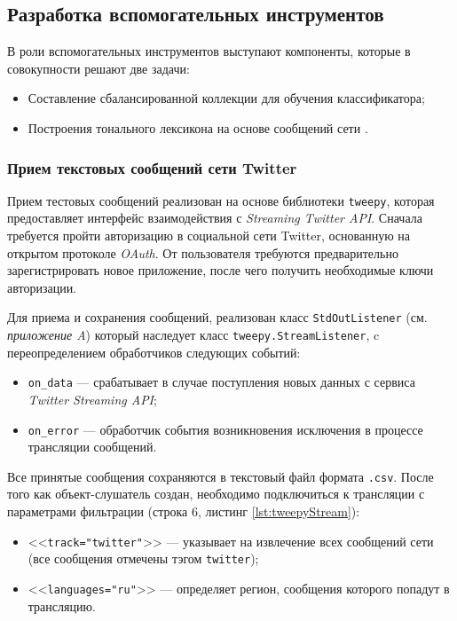 \subsection{Разработка вспомогательных инструментов}
В роли вспомогательных инструментов выступают компоненты, которые в совокупности
решают две задачи:
\begin{itemize}
    \item Составление сбалансированной коллекции для обучения классификатора;
    \item Построения тонального лексикона на основе сообщений сети \twitter.
\end{itemize}


    \subsubsection{Прием текстовых сообщений сети Twitter}
    Прием тестовых сообщений реализован на основе библиотеки {\tt tweepy}, которая
    предоставляет интерфейс взаимодействия с {\it Streaming Twitter API}.
    Сначала требуется пройти авторизацию в социальной сети Twitter, основанную
    на открытом протоколе {\it OAuth}.
    От пользователя требуются предварительно зарегистрировать новое приложение,
    после чего получить необходимые ключи авторизации.

    Для приема и сохранения сообщений, реализован класс {\tt StdOutListener}
    (см. {\it приложение A}) который  наследует класс {\tt tweepy.StreamListener},
    c переопределением обработчиков следующих событий:
    \begin{itemize}
        \item {\tt on\_data} --- срабатывает в случае поступления новых данных
        с сервиса {\it Twitter Streaming API};
        \item {\tt on\_error} --- обработчик события возникновения исключения
        в процессе трансляции сообщений.
    \end{itemize}

    Все принятые сообщения сохраняются в текстовый файл формата {\tt .csv}.
    После того как объект-слушатель создан, необходимо подключиться к трансляции
    с параметрами фильтрации (строка 6, листинг \ref{lst:tweepyStream}):
    \begin{itemize}
        \item <<{\tt track=\lbrack"twitter"\rbrack}>> --- указывает на
        извлечение всех сообщений сети (все сообщения отмечены тэгом
        {\tt twitter});
        \item <<{\tt languages=\lbrack"ru"\rbrack}>> --- определяет регион,
        сообщения которого попадут в трансляцию.
    \end{itemize}

